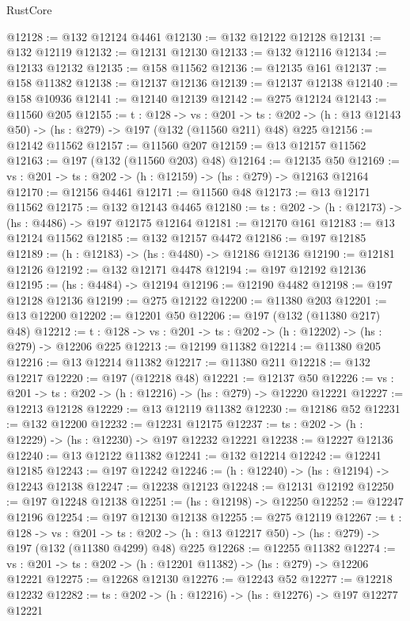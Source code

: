 \begin{lexlean}{RustCore}
\begin{coremodule}
@12128 := @132 @12124 @4461
@12130 := @132 @12122 @12128
@12131 := @132 @12119
@12132 := @12131 @12130
@12133 := @132 @12116
@12134 := @12133 @12132
@12135 := @158 @11562
@12136 := @12135 @161
@12137 := @158 @11382
@12138 := @12137 @12136
@12139 := @12137 @12138
@12140 := @158 @10936
@12141 := @12140 @12139
@12142 := @275 @12124
@12143 := @11560 @205
@12155 := {t : @128} ->
  {vs : @201} ->
  {ts : @202} -> (h : @13 @12143 @50) -> (hs : @279) -> @197 (@132 (@11560 @211) @48) @225
@12156 := @12142 @11562
@12157 := @11560 @207
@12159 := @13 @12157 @11562
@12163 := @197 (@132 (@11560 @203) @48)
@12164 := @12135 @50
@12169 := {vs : @201} -> {ts : @202} -> (h : @12159) -> (hs : @279) -> @12163 @12164
@12170 := @12156 @4461
@12171 := @11560 @48
@12173 := @13 @12171 @11562
@12175 := @132 @12143 @4465
@12180 := {ts : @202} -> (h : @12173) -> (hs : @4486) -> @197 @12175 @12164
@12181 := @12170 @161
@12183 := @13 @12124 @11562
@12185 := @132 @12157 @4472
@12186 := @197 @12185
@12189 := (h : @12183) -> (hs : @4480) -> @12186 @12136
@12190 := @12181 @12126
@12192 := @132 @12171 @4478
@12194 := @197 @12192 @12136
@12195 := (hs : @4484) -> @12194
@12196 := @12190 @4482
@12198 := @197 @12128 @12136
@12199 := @275 @12122
@12200 := @11380 @203
@12201 := @13 @12200
@12202 := @12201 @50
@12206 := @197 (@132 (@11380 @217) @48)
@12212 := {t : @128} -> {vs : @201} -> {ts : @202} -> (h : @12202) -> (hs : @279) -> @12206 @225
@12213 := @12199 @11382
@12214 := @11380 @205
@12216 := @13 @12214 @11382
@12217 := @11380 @211
@12218 := @132 @12217
@12220 := @197 (@12218 @48)
@12221 := @12137 @50
@12226 := {vs : @201} -> {ts : @202} -> (h : @12216) -> (hs : @279) -> @12220 @12221
@12227 := @12213 @12128
@12229 := @13 @12119 @11382
@12230 := @12186 @52
@12231 := @132 @12200
@12232 := @12231 @12175
@12237 := {ts : @202} -> (h : @12229) -> (hs : @12230) -> @197 @12232 @12221
@12238 := @12227 @12136
@12240 := @13 @12122 @11382
@12241 := @132 @12214
@12242 := @12241 @12185
@12243 := @197 @12242
@12246 := (h : @12240) -> (hs : @12194) -> @12243 @12138
@12247 := @12238 @12123
@12248 := @12131 @12192
@12250 := @197 @12248 @12138
@12251 := (hs : @12198) -> @12250
@12252 := @12247 @12196
@12254 := @197 @12130 @12138
@12255 := @275 @12119
@12267 := {t : @128} ->
  {vs : @201} ->
  {ts : @202} -> (h : @13 @12217 @50) -> (hs : @279) -> @197 (@132 (@11380 @4299) @48) @225
@12268 := @12255 @11382
@12274 := {vs : @201} -> {ts : @202} -> (h : @12201 @11382) -> (hs : @279) -> @12206 @12221
@12275 := @12268 @12130
@12276 := @12243 @52
@12277 := @12218 @12232
@12282 := {ts : @202} -> (h : @12216) -> (hs : @12276) -> @197 @12277 @12221

\end{coremodule}
\end{lexlean}

